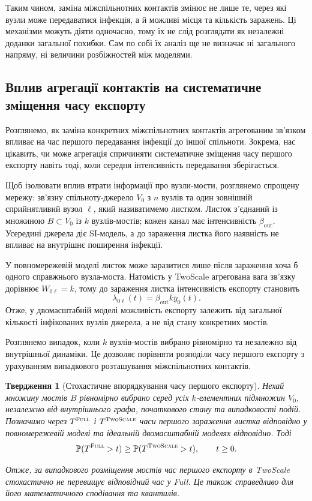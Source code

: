 \documentclass[a4paper,fleqn]{cas-sc}
\newtheorem{proposition}{Твердження}
\newcommand{\ibar}{\bar{y}}
\newcommand{\Full}{\textup{\textsc{Full}}}
\newcommand{\TS}{\textup{\textsc{TwoScale}}}
\begin{document}
Таким чином, заміна міжспільнотних контактів змінює не лише те, через які вузли може передаватися інфекція, а й можливі місця та кількість заражень. Ці механізми можуть діяти одночасно, тому їх не слід розглядати як незалежні доданки загальної похибки. Сам по собі їх аналіз ще не визначає ні загального напряму, ні величини розбіжностей між моделями.



\subsection{Вплив агрегації контактів на систематичне зміщення часу експорту}
\label{sec:single_export}

Розглянемо, як заміна конкретних міжспільнотних контактів агрегованим зв'язком впливає на час першого передавання інфекції до іншої спільноти. Зокрема, нас цікавить, чи може агрегація спричиняти систематичне зміщення часу першого експорту навіть тоді, коли середня інтенсивність передавання зберігається.

Щоб ізолювати вплив втрати інформації про вузли-мости, розглянемо спрощену мережу: зв'язну спільноту-джерело $V_0$ з $n$ вузлів та один зовнішній сприйнятливий вузол $\ell$, який називатимемо листком. Листок з'єднаний із множиною $B\subset V_0$ із $k$ вузлів-мостів; кожен канал має інтенсивність $\beta_{\mathrm{out}}$. Усередині джерела діє SI-модель, а до зараження листка його наявність не впливає на внутрішнє поширення інфекції.

У повномережевій моделі листок може заразитися лише після зараження хоча б одного справжнього вузла-моста. Натомість у TwoScale агрегована вага зв'язку дорівнює $W_{0\ell}=k$, тому до зараження листка інтенсивність експорту становить
\[
\lambda_{0\ell}(t)
=
\beta_{\mathrm{out}}k\ibar_0(t).
\]
Отже, у двомасштабній моделі можливість експорту залежить від загальної кількості інфікованих вузлів джерела, а не від стану конкретних мостів.

Розглянемо випадок, коли $k$ вузлів-мостів вибрано рівномірно та незалежно від внутрішньої динаміки. Це дозволяє порівняти розподіли часу першого експорту з урахуванням випадкового розташування міжспільнотних контактів.

\begin{proposition}[Стохастичне впорядкування часу першого експорту]
\label{prop:ordering}
Нехай множину мостів $B$ рівномірно вибрано серед усіх $k$-елементних підмножин $V_0$, незалежно від внутрішнього графа, початкового стану та випадковості подій. Позначимо через $T^{\Full}$ і $T^{\TS}$ часи першого зараження листка відповідно у повномережевій моделі та ідеальній двомасштабній моделях відповідно. Тоді
\[
\mathbb{P}(T^{\Full}>t)
\geq
\mathbb{P}(T^{\TS}>t),
\qquad t\geq 0.
\]

Отже, за випадкового розміщення мостів час першого експорту в TwoScale стохастично не перевищує відповідний час у Full. Це також справедливо для його математичного сподівання та квантилів.
\end{proposition}
\end{document}
